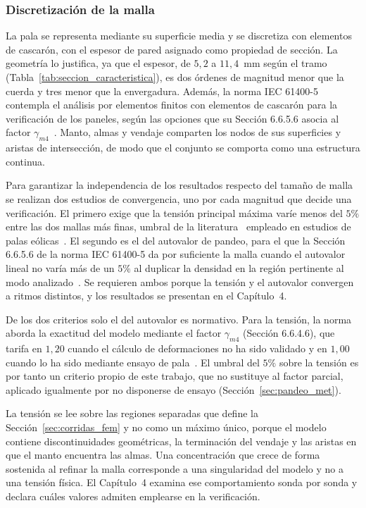 \subsubsection{Discretización de la malla}
\label{sec:malla}

La pala se representa mediante su superficie media y se discretiza con elementos de cascarón, con el espesor de pared asignado como propiedad de sección. La geometría lo justifica, ya que el espesor, de $5{,}2$ a $11{,}4$~mm según el tramo (Tabla~\ref{tab:seccion_caracteristica}), es dos órdenes de magnitud menor que la cuerda y tres menor que la envergadura. Además, la norma IEC 61400-5 contempla el análisis por elementos finitos con elementos de cascarón para la verificación de los paneles, según las opciones que su Sección 6.6.5.6 asocia al factor $\gamma_{m4}$~\parencite*{IEC61400-5}. Manto, almas y vendaje comparten los nodos de sus superficies y aristas de intersección, de modo que el conjunto se comporta como una estructura continua.

Para garantizar la independencia de los resultados respecto del tamaño de malla se realizan dos estudios de convergencia, uno por cada magnitud que decide una verificación. El primero exige que la tensión principal máxima varíe menos del $5\%$ entre las dos mallas más finas, umbral de la literatura~\parencite{Qin2026} empleado en estudios de palas eólicas~\parencite{Hameed2015,Boudounit2020}. El segundo es el del autovalor de pandeo, para el que la Sección 6.6.5.6 de la norma IEC 61400-5 da por suficiente la malla cuando el autovalor lineal no varía más de un $5\%$ al duplicar la densidad en la región pertinente al modo analizado~\parencite*{IEC61400-5}. Se requieren ambos porque la tensión y el autovalor convergen a ritmos distintos, y los resultados se presentan en el Capítulo~4.

De los dos criterios solo el del autovalor es normativo. Para la tensión, la norma aborda la exactitud del modelo mediante el factor $\gamma_{m4}$ (Sección 6.6.4.6), que tarifa en $1{,}20$ cuando el cálculo de deformaciones no ha sido validado y en $1{,}00$ cuando lo ha sido mediante ensayo de pala~\parencite{IEC61400-5}. El umbral del $5\%$ sobre la tensión es por tanto un criterio propio de este trabajo, que no sustituye al factor parcial, aplicado igualmente por no disponerse de ensayo (Sección~\ref{sec:pandeo_met}).

La tensión se lee sobre las regiones separadas que define la Sección~\ref{sec:corridas_fem} y no como un máximo único, porque el modelo contiene discontinuidades geométricas, la terminación del vendaje y las aristas en que el manto encuentra las almas. Una concentración que crece de forma sostenida al refinar la malla corresponde a una singularidad del modelo y no a una tensión física. El Capítulo~4 examina ese comportamiento sonda por sonda y declara cuáles valores admiten emplearse en la verificación.

